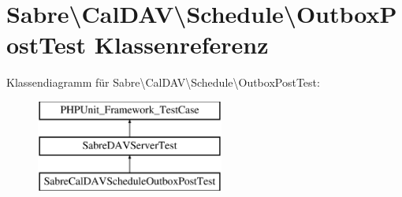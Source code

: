 \hypertarget{class_sabre_1_1_cal_d_a_v_1_1_schedule_1_1_outbox_post_test}{}\section{Sabre\textbackslash{}Cal\+D\+AV\textbackslash{}Schedule\textbackslash{}Outbox\+Post\+Test Klassenreferenz}
\label{class_sabre_1_1_cal_d_a_v_1_1_schedule_1_1_outbox_post_test}
Klassendiagramm für Sabre\textbackslash{}Cal\+D\+AV\textbackslash{}Schedule\textbackslash{}Outbox\+Post\+Test\+:\begin{figure}[H]
\begin{center}
\leavevmode
\includegraphics[height=3.000000cm]{class_sabre_1_1_cal_d_a_v_1_1_schedule_1_1_outbox_post_test}
\end{center}
\end{figure}

